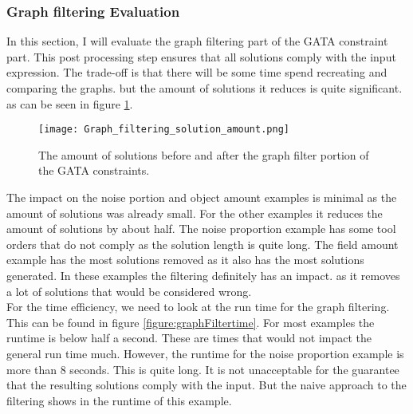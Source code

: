 \documentclass{article}
\begin{document}



\subsubsection{Graph filtering Evaluation}
In this section, I will evaluate the graph filtering part of the GATA constraint part. This post processing step ensures that all solutions comply with the input expression. The trade-off is that there will be some time spend recreating and comparing the graphs. but the amount of solutions it reduces is quite significant. as can be seen in figure \ref{figure:graphFilterAmount}. 


\begin{figure}[H]
  \centering
    \texttt{[image: Graph\_filtering\_solution\_amount.png]}
    \caption{The amount of solutions before and after the graph filter portion of the GATA constraints.}
    \label{figure:graphFilterAmount}
\end{figure}

The impact on the noise portion and object amount examples is minimal as the amount of solutions was already small. For the other examples it reduces the amount of solutions by about half. The noise proportion example has some tool orders that do not comply as the solution length is quite long. The field amount example has the most solutions removed as it also has the most solutions generated. In these examples the filtering definitely has an impact. as it removes a lot of solutions that would be considered wrong. \\

For the time efficiency, we need to look at the run time for the graph filtering. This can be found in figure \ref{figure:graphFiltertime}. For most examples the runtime is below half a second. These are times that would not impact the general run time much. However, the runtime for the noise proportion example is more than 8 seconds. This is quite long. It is not unacceptable for the guarantee that the resulting solutions comply with the input. But the naive approach to the filtering shows in the runtime of this example. 


\end{document}
